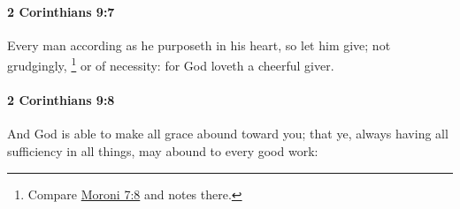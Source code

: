 		\paragraph{2 Corinthians 9:7} %
			\label{2CORINTHIANS-9-7}

			Every man according as he purposeth in his heart, so let him give; not grudgingly,%
				\footnote{%
					Compare \hyperref[MORONI-7-8]{Moroni 7:8} and notes there.
					}
			or of necessity: for God loveth a cheerful giver.

			\begin{framed}
			\scriptsize
				\begin{compactdesc}
					\item[SBLG] 
				\end{compactdesc}
			\end{framed}

		\paragraph{2 Corinthians 9:8} %
			\label{2CORINTHIANS-9-8}

			And God is able to make all grace abound toward you; that ye, always having all sufficiency in all things, may abound to every good work:

